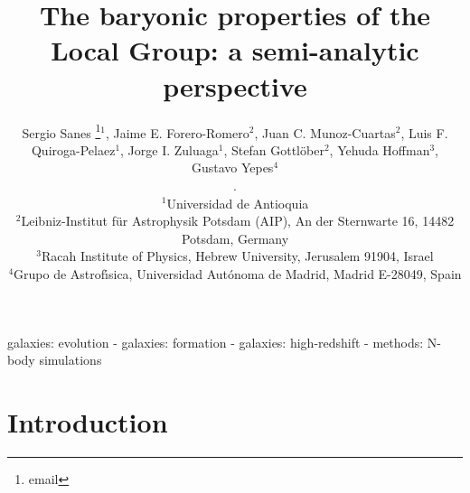 \documentclass[usenatbib]{mn2e}
\begin{document}
\title[The baryonic LG in SAMs]{The baryonic properties of the Local Group: a semi-analytic perspective}
\author[Sanes et al.]{
\parbox[t]{\textwidth}{\raggedright 
  Sergio Sanes \thanks{email}$^1$, 
  Jaime E. Forero-Romero$^2$,
  Juan C. Munoz-Cuartas$^2$,
  Luis F. \\Quiroga-Pelaez$^1$,
  Jorge I. Zuluaga$^1$,
  Stefan Gottl\"ober$^2$,
  Yehuda Hoffman$^3$,\\  
  Gustavo Yepes$^4$}.
\vspace*{6pt}\\
$^1$Universidad de Antioquia\\
$^2$Leibniz-Institut f\"ur Astrophysik Potsdam (AIP), An der Sternwarte 16, 14482 Potsdam, Germany\\ 
$^3$Racah Institute of Physics, Hebrew University, Jerusalem 91904, 
 Israel\\ 
$^4$Grupo de Astrof\'{\i}sica, Universidad Aut\'onoma de Madrid,   Madrid
E-28049, Spain\\
}
\maketitle

\begin{abstract}

\end{abstract}
\begin{keywords}
galaxies: evolution - galaxies: formation -
galaxies: high-redshift - methods: N-body simulations
\end{keywords}





\section{Introduction}
\label{sec:introduction}
\end{document}
